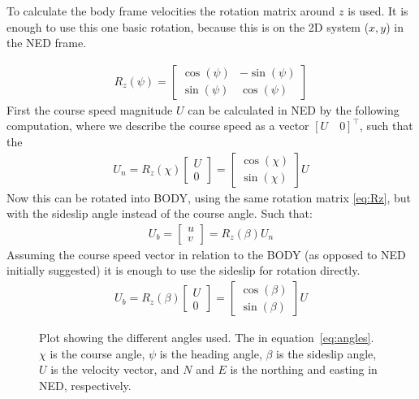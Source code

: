 To calculate the body frame velocities the rotation matrix around $z$ is used. It is enough to use this one basic rotation, because this is on the 2D system ($x,y$) in the \ac{NED} frame.

\begin{align}
R_{z} (\psi) =
\begin{bmatrix}
\cos(\psi) & -\sin(\psi)\\
\sin(\psi) & \cos(\psi)
\end{bmatrix}
\label{eq:Rz}
\end{align}
First the course speed magnitude $U$ can be calculated in \ac{NED} by the following computation, where we describe the course speed as a vector $[U\quad 0]^\top$, such that the 
\begin{align}
U_n = R_{z} (\chi)
\begin{bmatrix}
U \\ 0 
\end{bmatrix}
=
\begin{bmatrix}
\cos(\chi) \\
\sin(\chi)
\end{bmatrix}
U
\end{align}
Now this can be rotated into \ac{BODY}, using the same rotation matrix \vref{eq:Rz}, but with the sideslip angle instead of the course angle. Such that:
\begin{align}
U_b = \begin{bmatrix}
u \\ v
\end{bmatrix}
= R_z (\beta) U_n
\end{align}
Assuming the course speed vector in relation to the \ac{BODY} (as opposed to \ac{NED} initially suggested) it is enough to use the sideslip for rotation directly.
\begin{align}
U_b = R_{z} (\beta)
\begin{bmatrix}
U \\ 0 
\end{bmatrix}
=
\begin{bmatrix}
\cos(\beta) \\
\sin(\beta)
\end{bmatrix}
U
\end{align}

\begin{figure}[htbp]
	\centering
	
	\caption{Plot showing the different angles used. The in
		equation~\vref{eq:angles}. $\chi$ is the course angle, $\psi$ is
	the heading angle, $\beta$ is the sideslip angle, $U$ is the
velocity vector, and $N$ and $E$ is the northing and easting in NED,
respectively.}
	\label{fig:natical_angles}
\end{figure}


